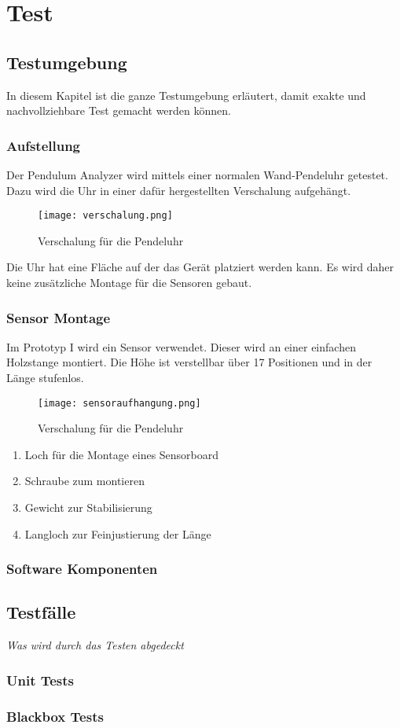 \section{Test}
		\subsection{Testumgebung}
        In diesem Kapitel ist die ganze Testumgebung erläutert, damit exakte und nachvollziehbare Test gemacht werden können.
        \subsubsection{Aufstellung}
        Der Pendulum Analyzer wird mittels einer normalen Wand-Pendeluhr getestet. Dazu wird die Uhr in einer dafür hergestellten Verschalung aufgehängt.
        \begin{figure}[H]
            \centering
            \texttt{[image: verschalung.png]}
            \caption{Verschalung für die Pendeluhr}
        \end{figure}

        \noindent Die Uhr hat eine Fläche auf der das Gerät platziert werden kann. Es wird daher keine zusätzliche Montage für die Sensoren gebaut.
        
        \clearpage
        \subsubsection{Sensor Montage}
        Im Prototyp I wird ein Sensor verwendet. Dieser wird an einer einfachen Holzstange montiert. Die Höhe ist verstellbar über 17 Positionen und in der Länge stufenlos.
        \begin{figure}[H]
            \centering
            \texttt{[image: sensoraufhangung.png]}
            \caption{Verschalung für die Pendeluhr}
        \end{figure}
        \begin{enumerate}
            \item Loch für die Montage eines Sensorboard
            \item Schraube zum montieren
            \item Gewicht zur Stabilisierung
            \item Langloch zur Feinjustierung der Länge
        \end{enumerate}
        \subsubsection{Software Komponenten}

		\subsection{Testfälle}
			\textit{Was wird durch das Testen abgedeckt}
			\subsubsection{Unit Tests}
			\subsubsection{Blackbox Tests}